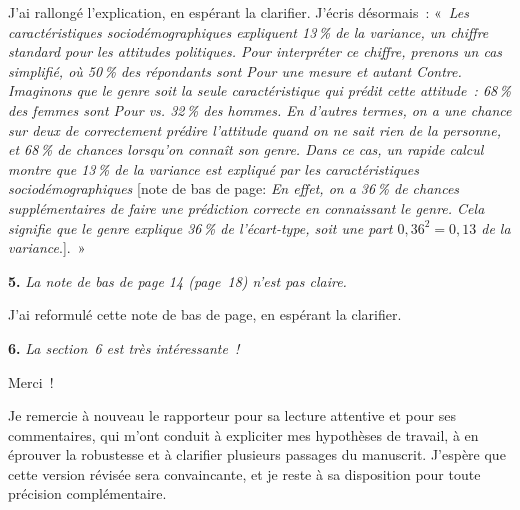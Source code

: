 \documentclass[12pt,french]{article}
\begin{document}
J'ai rallongé l'explication, en espérant la clarifier. J'écris désormais~: «~\textit{Les caractéristiques sociodémographiques expliquent 13\,\% de la variance, un chiffre standard pour les attitudes politiques. Pour interpréter ce chiffre, prenons un cas simplifié, où 50\,\% des répondants sont \textit{Pour} une mesure et autant \textit{Contre}. Imaginons que le genre soit la seule caractéristique qui prédit cette attitude~: 68\,\% des femmes sont \textit{Pour} vs. 32\,\% des hommes. En d'autres termes, on a une chance sur deux de correctement prédire l'attitude quand on ne sait rien de la personne, et 68\,\% de chances lorsqu'on connaît son genre. Dans ce cas, un rapide calcul montre que 13\,\% de la variance est expliqué par les caractéristiques sociodémographiques} [note de bas de page: \textit{En effet, on a 36\,\% de chances supplémentaires de faire une prédiction correcte en connaissant le genre. Cela signifie que le genre explique 36\,\% de l'écart-type, soit une part $0,36^2=0,13$ de la variance}.].~»

\bigskip
\noindent\textbf{5.} \textit{La note de bas de page 14 (page~18) n'est pas claire.}

J'ai reformulé cette note de bas de page, en espérant la clarifier.

\bigskip
\noindent\textbf{6.} \textit{La section~6 est très intéressante~!}

Merci~!

\bigskip
\noindent Je remercie à nouveau le rapporteur pour sa lecture attentive et pour ses commentaires, qui m'ont conduit à expliciter mes hypothèses de travail, à en éprouver la robustesse et à clarifier plusieurs passages du manuscrit. J'espère que cette version révisée sera convaincante, et je reste à sa disposition pour toute précision complémentaire.

\clearpage
\renewcommand{\url}[1]{\href{#1}{Link}}
% 
% 
\end{document}
